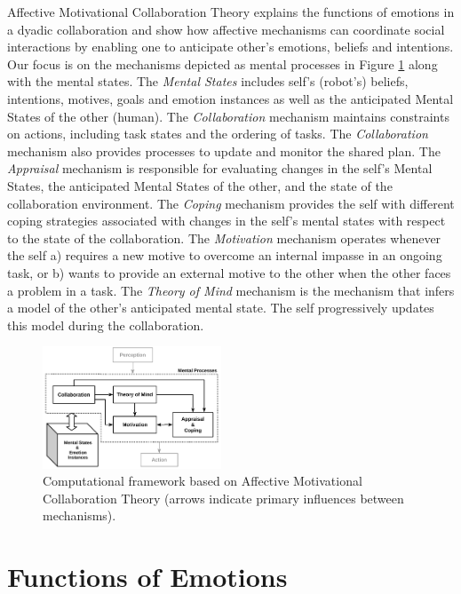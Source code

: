 \documentclass[letterpaper]{article}
\begin{document}
Affective Motivational Collaboration Theory explains the functions of emotions
in a dyadic collaboration and show how affective mechanisms can coordinate
social interactions by enabling one to anticipate other's emotions, beliefs and
intentions. Our focus is on the mechanisms depicted as mental processes in
Figure \ref{fig:cpm} along with the mental states. The \textit{Mental States}
includes self's (robot's) beliefs, intentions, motives, goals and emotion
instances as well as the anticipated Mental States of the other (human). The
\textit{Collaboration} mechanism maintains constraints on actions, including
task states and the ordering of tasks. The \textit{Collaboration} mechanism also
provides processes to update and monitor the shared plan. The \textit{Appraisal}
mechanism is responsible for evaluating changes in the self's Mental States, the
anticipated Mental States of the other, and the state of the collaboration
environment. The \textit{Coping} mechanism provides the self with different
coping strategies associated with changes in the self's mental states with
respect to the state of the collaboration. The \textit{Motivation} mechanism
operates whenever the self a) requires a new motive to overcome an internal
impasse in an ongoing task, or b) wants to provide an external motive to the
other when the other faces a problem in a task. The \textit{Theory of Mind}
mechanism is the mechanism that infers a model of the other's anticipated mental
state. The self progressively updates this model during the collaboration.

\begin{figure}[tbh]
  \centering
  \includegraphics[width=0.474\textwidth]{figure/theory-general-croped.pdf}
  \caption{Computational framework based on Affective Motivational Collaboration
  Theory (arrows indicate primary influences between mechanisms).}
  \label{fig:cpm}
\end{figure}

\section{Functions of Emotions}
\end{document}
